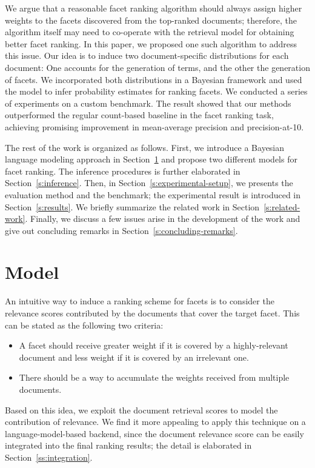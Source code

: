 We argue that a reasonable facet ranking algorithm should always assign higher
weights to the facets discovered from the top-ranked documents; therefore, the
algorithm itself may need to co-operate with the retrieval model for obtaining
better facet ranking.  In this paper, we proposed one such algorithm to address
this issue.  Our idea is to induce two document-specific distributions for each
document: One accounts for the generation of terms, and the other the
generation of facets.  We incorporated both distributions in a Bayesian
framework and used the model to infer probability estimates for ranking facets.
We conducted a series of experiments on a custom benchmark.  The result showed
that our methods outperformed the regular count-based baseline in the facet
ranking task, achieving promising improvement in mean-average precision and
precision-at-10. 

The rest of the work is organized as follows.  First, we introduce a Bayesian language
modeling approach in Section~\ref{s:model} and propose two different models for
facet ranking.  The inference procedures is further elaborated in
Section~\ref{s:inference}.  Then, in Section~\ref{s:experimental-setup}, we presents the
evaluation method and the benchmark; the experimental result is introduced in
Section~\ref{s:results}.  We briefly summarize the related work in
Section~\ref{s:related-work}.  Finally, we discuss a few issues arise in the
development of the work and give out concluding remarks in
Section~\ref{s:concluding-remarks}.

\section{Model}\label{s:model}

An intuitive way to induce a ranking scheme for facets is to consider the
relevance scores contributed by the documents that cover the target facet.
This can be stated as the following two criteria: \begin{itemize} \item A facet
should receive greater weight if it is covered by a highly-relevant document and
less weight if it is covered by an irrelevant one. \item There
should be a way to accumulate the weights received from multiple documents.
\end{itemize} Based on this idea, we exploit the document retrieval scores to
model the contribution of relevance.  We find it more appealing to apply this
technique on a language-model-based backend, since the document relevance score
can be easily integrated into the final ranking results; the detail is
elaborated in Section~\ref{ss:integration}.

